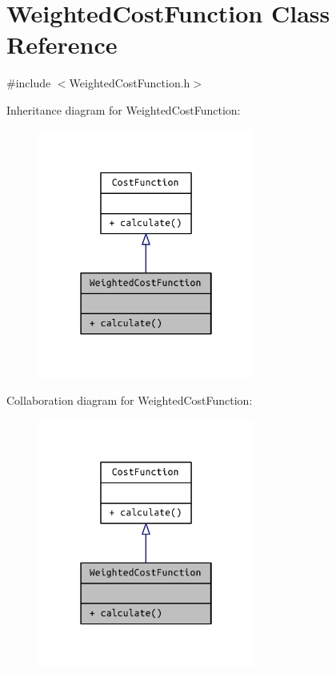 \hypertarget{class_weighted_cost_function}{}\section{Weighted\+Cost\+Function Class Reference}
\label{class_weighted_cost_function}


{\ttfamily \#include $<$Weighted\+Cost\+Function.\+h$>$}



Inheritance diagram for Weighted\+Cost\+Function\+:
\nopagebreak
\begin{figure}[H]
\begin{center}
\leavevmode
\includegraphics[width=202pt]{class_weighted_cost_function__inherit__graph}
\end{center}
\end{figure}


Collaboration diagram for Weighted\+Cost\+Function\+:
\nopagebreak
\begin{figure}[H]
\begin{center}
\leavevmode
\includegraphics[width=202pt]{class_weighted_cost_function__coll__graph}
\end{center}
\end{figure}
